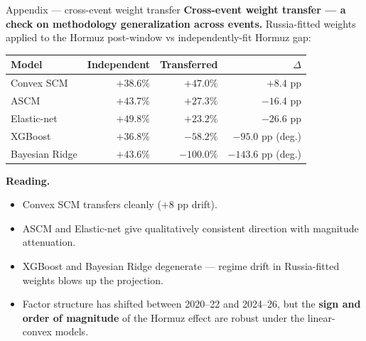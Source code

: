 \documentclass[aspectratio=169,11pt]{beamer}
\newcommand{\hd}[1]{\textbf{#1}}
\begin{document}
\begin{frame}{Appendix --- cross-event weight transfer}
  \footnotesize
  \hd{Cross-event weight transfer --- a check on methodology generalization across events.} Russia-fitted weights applied to the Hormuz post-window vs independently-fit Hormuz gap:
  \vspace{0.4em}
  \begin{center}
  \begin{tabular}{@{}l r r r@{}}
    \toprule
    \hd{Model}     & \hd{Independent} & \hd{Transferred} & \hd{$\Delta$} \\
    \midrule
    Convex SCM     & $+38.6\%$ & $+47.0\%$  & $+8.4$ pp \\
    ASCM           & $+43.7\%$ & $+27.3\%$  & $-16.4$ pp \\
    Elastic-net    & $+49.8\%$ & $+23.2\%$  & $-26.6$ pp \\
    XGBoost        & $+36.8\%$ & $-58.2\%$  & $-95.0$ pp (deg.) \\
    Bayesian Ridge & $+43.6\%$ & $-100.0\%$ & $-143.6$ pp (deg.) \\
    \bottomrule
  \end{tabular}
  \end{center}

  \vspace{0.6em}
  \hd{Reading.}
  \begin{itemize}\setlength\itemsep{0.1em}
    \item Convex SCM transfers cleanly ($+8$ pp drift).
    \item ASCM and Elastic-net give qualitatively consistent direction with magnitude attenuation.
    \item XGBoost and Bayesian Ridge degenerate --- regime drift in Russia-fitted weights blows up the projection.
    \item Factor structure has shifted between 2020--22 and 2024--26, but the \hd{sign and order of magnitude} of the Hormuz effect are robust under the linear-convex models.
  \end{itemize}
  \normalsize
\end{frame}
\end{document}
